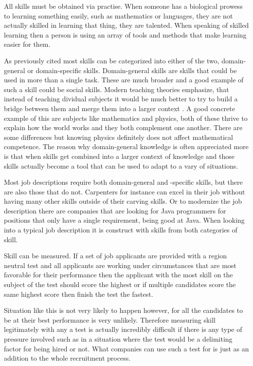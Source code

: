 \documentclass[11pt,a4paper,oneside,article]{memoir}
\begin{document}
All skills must be obtained via practise. When someone has a biological prowess to learning something easily, such as mathematics or languages, they are not actually skilled in learning that thing, they are talented. When speaking of skilled learning then a person is using an array of tools and methods that make learning easier for them.

As previously cited most skills can be categorized into either of the two, domain-general or domain-specific skills. Domain-general skills are skills that could be used in more than a single task. These are much broader and a good example of such a skill could be social skills. Modern teaching theories emphasize, that instead of teaching dividual subjects it would be much better to try to build a bridge between them and merge them into a larger context \cite{mansoor:article}. A good concrete example of this are subjects like mathematics and physics, both of these thrive to explain how the world works and they both complement one another. There are some differences but knowing physics definitely does not affect mathematical competence. The reason why domain-general knowledge is often appreciated more is that when skills get combined into a larger context of knowledge and those skills actually become a tool that can be used to adapt to a vary of situations.

Most job descriptions require both domain-general and -specific skills, but there are also those that do not. Carpenters for instance can excel in their job without having many other skills outside of their carving skills. Or to modernize the job description there are companies that are looking for Java programmers for positions that only have a single requirement, being good at Java. When looking into a typical job description it is construct with skills from both categories of skill.

Skill can be measured. If a set of job applicants are provided with a region neutral test and all applicants are working under circumstances that are most favorable for their performance then the applicant with the most skill on the subject of the test should score the highest or if multiple candidates score the same highest score then finish the test the fastest. 

Situation like this is not very likely to happen however, for all the candidates to be at their best performance is very unlikely. Therefore measuring skill legitimately with any a test is actually incredibly difficult if there is any type of pressure involved such as in a situation where the test would be a delimiting factor for being hired or not. What companies can use such a test for is just as an addition to the whole recruitment process.
\end{document}
